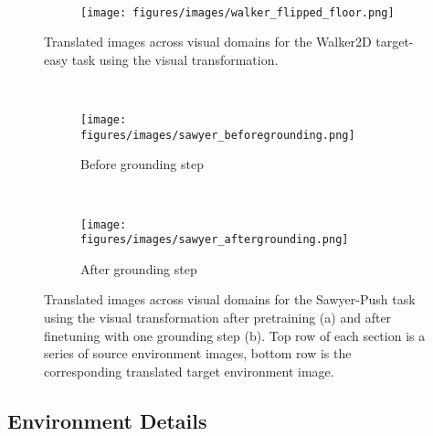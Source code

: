 \begin{figure}[ht]
    \centering
    \begin{subfigure}[t]{\linewidth}
        \centering
    \end{subfigure}
    \\
    \begin{subfigure}{\linewidth}
        \centering
        \texttt{[image: figures/images/walker\_flipped\_floor.png]}
    \end{subfigure}
    \caption{
        Translated images across visual domains for the Walker2D target-easy task using the visual transformation.  
    }
    \label{fig:walker_flipped_floor}
\end{figure}


\begin{figure}[ht]
    \centering
    \begin{subfigure}[t]{\linewidth}
        \centering
    \end{subfigure}
    \\
    \begin{subfigure}{\linewidth}
        \centering
        \texttt{[image: figures/images/sawyer\_beforegrounding.png]}
        \caption{Before grounding step}
    \end{subfigure} 
    \\
    \begin{subfigure}{\linewidth}
        \centering
        \texttt{[image: figures/images/sawyer\_aftergrounding.png]}
        \caption{After grounding step}
    \end{subfigure}
    \caption{
        Translated images across visual domains for the Sawyer-Push task using the visual transformation after pretraining (a) and after finetuning with one grounding step (b).  
        Top row of each section is a series of source environment images, bottom row is the corresponding translated target environment image.  
    }
    \label{fig:gen_imgs}
\end{figure}



\subsection{Environment Details}
\label{sec:environment_details}

